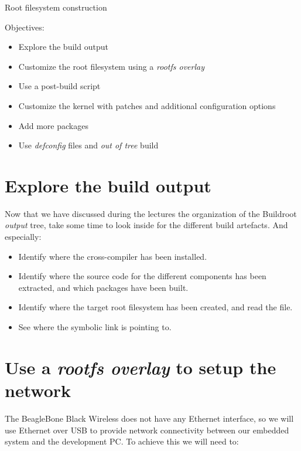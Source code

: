 \subchapter
{Root filesystem construction}
{Objectives:
  \begin{itemize}
  \item Explore the build output
  \item Customize the root filesystem using a {\em rootfs overlay}
  \item Use a post-build script
  \item Customize the kernel with patches and additional configuration
    options
  \item Add more packages
  \item Use {\em defconfig} files and {\em out of tree} build
  \end{itemize}
}

\section{Explore the build output}

Now that we have discussed during the lectures the organization of the
Buildroot {\em output} tree, take some time to look inside
 for the different build artefacts. And especially:

\begin{itemize}

\item Identify where the cross-compiler has been installed.

\item Identify where the source code for the different components has
  been extracted, and which packages have been built.

\item Identify where the target root filesystem has been created, and
  read the  file.

\item See where the  symbolic link is pointing to.

\end{itemize}

\section{Use a {\em rootfs overlay} to setup the network}

The BeagleBone Black Wireless does not have any Ethernet interface, so
we will use Ethernet over USB to provide network connectivity between
our embedded system and the development PC. To achieve this we will
need to:


